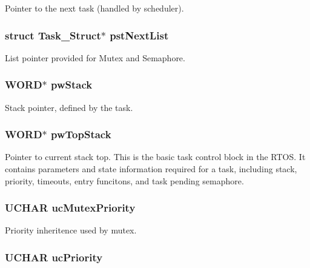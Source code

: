 Pointer to the next task (handled by scheduler). 
\subsubsection[{pstNextList}]{\setlength{\rightskip}{0pt plus 5cm}struct {\bf Task\_\-Struct}$\ast$ {\bf pstNextList}}\label{struct_task___struct_a7fd2ba434d6f7e97476e3fd90e2cfe2b}


List pointer provided for Mutex and Semaphore. 
\subsubsection[{pwStack}]{\setlength{\rightskip}{0pt plus 5cm}WORD$\ast$ {\bf pwStack}}\label{struct_task___struct_a4ce087c68a76632ef0a9fccc4b965d18}


Stack pointer, defined by the task. 
\subsubsection[{pwTopStack}]{\setlength{\rightskip}{0pt plus 5cm}WORD$\ast$ {\bf pwTopStack}}\label{struct_task___struct_aeff7d029ad2aee79959c1d10218423d3}


Pointer to current stack top. This is the basic task control block in the RTOS. It contains parameters and state information required for a task, including stack, priority, timeouts, entry funcitons, and task pending semaphore. 
\subsubsection[{ucMutexPriority}]{\setlength{\rightskip}{0pt plus 5cm}UCHAR {\bf ucMutexPriority}}\label{struct_task___struct_aa2e217be0bb7da89a03be8f31b1759f9}


Priority inheritence used by mutex. 
\subsubsection[{ucPriority}]{\setlength{\rightskip}{0pt plus 5cm}UCHAR {\bf ucPriority}}\label{struct_task___struct_a5b5e11c9fa0d320daa073630624064fe}


